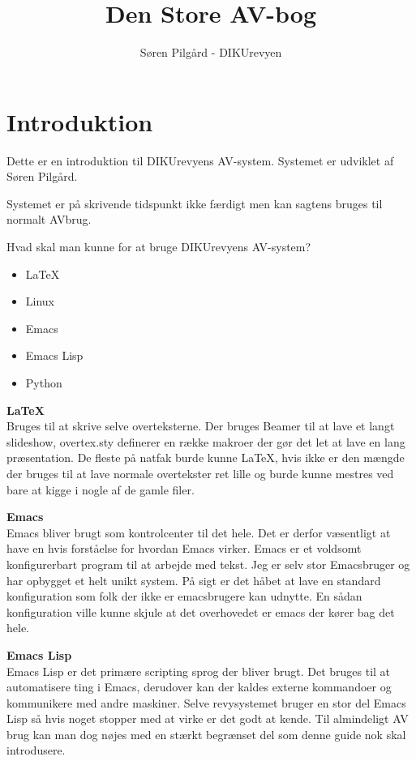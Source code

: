 \documentclass[10pt,a4paper,danish]{article}
\title{Den Store AV-bog}
\author{Søren Pilgård - DIKUrevyen}
\begin{document}
\maketitle
\newpage

\tableofcontents
\newpage

\section{Introduktion}
Dette er en introduktion til DIKUrevyens AV-system.
Systemet er udviklet af Søren Pilgård.

Systemet er på skrivende tidspunkt ikke færdigt men kan sagtens bruges til
normalt AVbrug.

Hvad skal man kunne for at bruge DIKUrevyens AV-system?

\begin{itemize}
\item \LaTeX
\item Linux
\item Emacs
\item Emacs Lisp
\item Python
\end{itemize}

\textbf{\LaTeX}\\
Bruges til at skrive selve overteksterne. Der bruges Beamer til at lave et langt
slideshow, overtex.sty definerer en række makroer der gør det let at lave en
lang præsentation.
De fleste på natfak burde kunne \LaTeX, hvis ikke er den mængde der bruges til
at lave normale overtekster ret lille og burde kunne mestres ved bare at kigge i
nogle af de gamle filer.

\textbf{Emacs}\\
Emacs bliver brugt som kontrolcenter til det hele.
Det er derfor væsentligt at have en hvis forståelse for hvordan Emacs virker.
Emacs er et voldsomt konfigurerbart program til at arbejde med tekst.
Jeg er selv stor Emacsbruger og har opbygget et helt unikt system.
På sigt er det håbet at lave en standard konfiguration som folk der ikke er
emacsbrugere kan udnytte. En sådan konfiguration ville kunne skjule at det
overhovedet er emacs der kører bag det hele.

\textbf{Emacs Lisp}\\
Emacs Lisp er det primære scripting sprog der bliver brugt.
Det bruges til at automatisere ting i Emacs, derudover kan der kaldes externe
kommandoer og kommunikere med andre maskiner.
Selve revysystemet bruger en stor del Emacs Lisp så hvis noget stopper med at
virke er det godt at kende. Til almindeligt AV brug kan man dog nøjes med en
stærkt begrænset del som denne guide nok skal introdusere.
\end{document}
